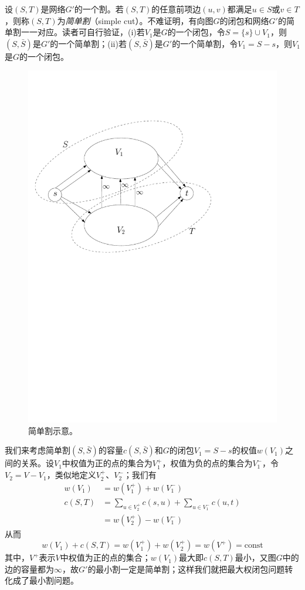 \documentclass[a4paper]{ctexbook}
\begin{document}
  设$(S,T)$是网络$G'$的一个割。若$(S,T)$的任意前项边$(u,v)$都满足$u\in S$或$v\in T$，则称$(S,T)$为\emph{简单割}（simple cut）。不难证明，有向图$G$的闭包和网络$G'$的简单割一一对应。读者可自行验证，(i)若$V_1$是$G$的一个闭包，令$S=\{s\}\cup V_1$，则$(S,\bar{S})$是$G'$的一个简单割；(ii)若$(S,\bar{S})$是$G'$的一个简单割，令$V_1=S-s$，则$V_1$是$G$的一个闭包。
  \begin{figure}
    \centering
    \includegraphics[scale=0.5]{figures/simple-cut}
    \caption{简单割示意。}
    \label{Fig:simple-cut}
  \end{figure}
  我们来考虑简单割$(S,\bar{S})$的容量$c(S,\bar{S})$和$G$的闭包$V_1=S-s$的权值$w(V_1)$之间的关系。设$V_1$中权值为正的点的集合为$V_1^+$，权值为负的点的集合为$V_1^-$，令$V_2=V-V_1$，类似地定义$V_2^+$、$V_2^-$；我们有
  \begin{align*}
    w(V_1) &=w(V_1^+) + w(V_1^-)\\
    c(S,T) &= \sum_{u\in V_2^+}c(s,u) + \sum_{u\in V_1^-}c(u,t)\\
    &= w(V_2^+) - w(V_1^-)
  \end{align*}
  从而
  \[ w(V_1) + c(S,T) = w(V_1^+) + w(V_2^+) = w(V^+)= \mathrm{const}\]
  其中，$V^+$表示$V$中权值为正的点的集合；$w(V_1)$最大即$c(S,T)$最小，又图$G$中的边的容量都为$\infty$，故$G'$的最小割一定是简单割；这样我们就把最大权闭包问题转化成了最小割问题。
\end{document}
